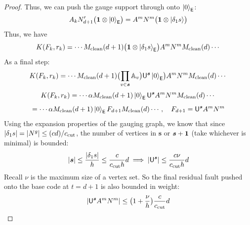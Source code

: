 \documentclass[11pt]{article}
\begin{document}
\begin{proof}
    Thus, we can push the gauge support through onto $\ket{0}_{\mathsf{E}}$:
    \[
    A_k N'_{d+1} \bigl ( \mathbf{1} \otimes \ket{0}_{\mathsf{E}}  \bigr ) = A^m N^m \bigl ( \mathbf{1} \otimes \ket{\delta_1 s}\bigr )
    \]
    Thus, we have
    \[
    K(F_k, r_k) = \cdots M_{\rm clean}(d+1) \bigl ( \mathbf{1} \otimes \ket{\delta_1 s}_{\mathsf{E}}  \bigr ) A^m N^m M_{\rm clean}(d) \cdots 
    \]
    As a final step: 
    \[
    K(F_k, r_k) = \cdots M_{\rm clean}(d+1) \bigl (\prod_{v \in \bm{s}} \mathbb{A}_v \bigr ) \mathsf{U}^{\bm s}  \ket{0}_{\mathsf{E}}  \bigr ) A^m N^m M_{\rm clean}(d) \cdots  
    \]
    \[
    K(F_k, r_k) = \cdots \alpha M_{\rm clean}(d+1) \ket{0}_{\mathsf{E}}  \mathsf{U}^{\bm s} A^m N^m M_{\rm clean}(d) \cdots 
    \]
    \[
    = \cdots \alpha M_{\rm clean}(d+1) \ket{0}_{\mathsf{E}} F_{d+1} M_{\rm clean}(d) \cdots, \quad F_{d+1} = \mathsf{U}^{\bm s} A^m N^m
    \]
    Using the expansion properties of the gauging graph, we know that since $|\delta_1 s| = |N^g| \leq (cd)/c_{\rm cut}$, the number of vertices in $\bm{s}$ or $\bm{s} + \mathbf{1}$ (take whichever is minimal) is bounded:
    \[
    |\bm{s}| \leq \frac{|\delta_1 s|}{h} \leq \frac{c}{c_{\rm cut} h} d \implies |\mathsf{U}^{\bm s}| \leq  \frac{c \nu}{c_{\rm cut} h} d
    \]
    Recall $\nu$ is the maximum size of a vertex set. So the final residual fault pushed onto the base code at $t = d+1$ is also bounded in weight:
    \[
    |\mathsf{U}^{\bm s} A^m N^m| \leq \bigl ( 1 + \frac{\nu}{h} \bigr )\frac{c}{c_{\rm cut}} d
    \]
    

\end{proof}
\end{document}
